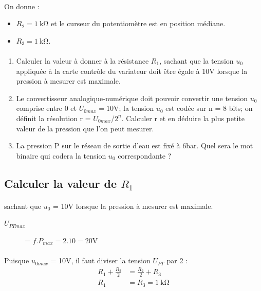 \documentclass{article}
\begin{document}
\paragraph{}
On donne :
\begin{itemize}
    \item $R_2 = \SI{1}{\kilo\ohm}$ et le curseur du potentiomètre est en position médiane.
    \item $R_3 = \SI{1}{\kilo\ohm}$.
\end{itemize}

\paragraph{}
\begin{enumerate}
    \item Calculer la valeur à donner à la résistance $R_1$, sachant que la tension $u_0$ appliquée à la carte contrôle du variateur doit être égale à 10V lorsque la pression à mesurer est maximale.
    \item Le convertisseur analogique-numérique doit pouvoir convertir une tension $u_0$ comprise entre 0 et $U_{0max} = 10\si{\volt}$; la tension $u_0$ est codée sur n = 8 bits; on définit la résolution r = $U_{0max}$/$2^n$. Calculer r et en déduire la plus petite valeur de la pression que l'on peut mesurer.
    \item La pression P sur le réseau de sortie d'eau est fixé à 6\si{\bar}. Quel sera le mot binaire qui codera la tension $u_0$ correspondante ?
\end{enumerate}

\subsection{Calculer la valeur de $R_1$}
\paragraph{}
sachant que $u_0$ = 10V lorsque la pression à mesurer est maximale.

\begin{description}
    \item[$U_{PTmax}$] = $f.P_{max} = 2.10 = 20 \si{\volt}$ 
\end{description}

\paragraph{}
Puisque $u_{0max}$ = 10V, il faut diviser la tension $U_{PT}$ par 2 :
\begin{align*}
    R_1 + \frac{R_2}{2} &= \frac{R_2}{2} + R_3\\
    R_1 &= R_3 = \SI{1}{\kilo\ohm}
\end{align*}
\end{document}
